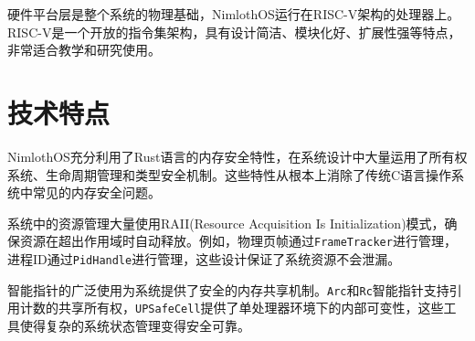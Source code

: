 硬件平台层是整个系统的物理基础，NimlothOS运行在RISC-V架构的处理器上。RISC-V是一个开放的指令集架构，具有设计简洁、模块化好、扩展性强等特点，非常适合教学和研究使用。

\section{技术特点}

NimlothOS充分利用了Rust语言的内存安全特性，在系统设计中大量运用了所有权系统、生命周期管理和类型安全机制。这些特性从根本上消除了传统C语言操作系统中常见的内存安全问题。

系统中的资源管理大量使用RAII(Resource Acquisition Is Initialization)模式，确保资源在超出作用域时自动释放。例如，物理页帧通过\texttt{FrameTracker}进行管理，进程ID通过\texttt{PidHandle}进行管理，这些设计保证了系统资源不会泄漏。

智能指针的广泛使用为系统提供了安全的内存共享机制。\texttt{Arc}和\texttt{Rc}智能指针支持引用计数的共享所有权，\texttt{UPSafeCell}提供了单处理器环境下的内部可变性，这些工具使得复杂的系统状态管理变得安全可靠。
